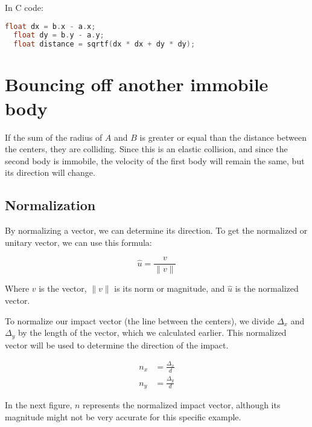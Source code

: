 \documentclass{amsart}
\begin{document}
In C code:

\begin{lstlisting}[language=C]
  float dx = b.x - a.x;
  float dy = b.y - a.y;
  float distance = sqrtf(dx * dx + dy * dy);
\end{lstlisting}

\section{Bouncing off another immobile body}

If the sum of the radius of $A$ and $B$ is greater or equal than the distance
between the centers, they are colliding. Since this is an elastic collision, and
since the second body is immobile, the velocity of the first body will remain
the same, but its direction will change.

\subsection{Normalization}

By normalizing a vector, we can determine its direction. To get the normalized
or unitary vector, we can use this formula:

\begin{displaymath}
  \hat{u} = \frac{v}{\|v\|}
\end{displaymath}

Where $v$ is the vector, $\|v\|$ is its norm or magnitude, and $\hat{u}$ is the
normalized vector.

To normalize our impact vector (the line between the centers), we divide
$\Delta_x$ and $\Delta_y$ by the length of the vector, which we calculated
earlier. This normalized vector will be used to determine the direction of the
impact.

\begin{align*}
  n_x &= \frac{\Delta_x}{d} \\
  n_y &= \frac{\Delta_y}{d}
\end{align*}

In the next figure, $n$ represents the normalized impact vector, although its
magnitude might not be very accurate for this specific example.
\end{document}
